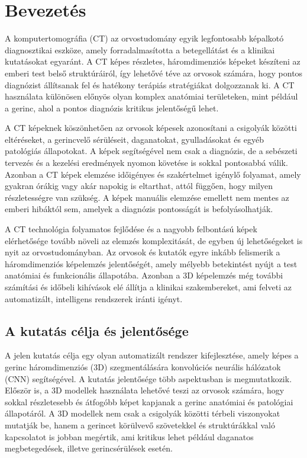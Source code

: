 \chapter{Bevezetés}  %
A komputertomográfia (CT) az orvostudomány egyik legfontosabb képalkotó diagnosztikai eszköze, amely forradalmasította a betegellátást és a klinikai kutatásokat egyaránt. A CT képes részletes, háromdimenziós képeket készíteni az emberi test belső struktúráiról, így lehetővé téve az orvosok számára, hogy pontos diagnózist állítsanak fel és hatékony terápiás stratégiákat dolgozzanak ki. A CT használata különösen előnyös olyan komplex anatómiai területeken, mint például a gerinc, ahol a pontos diagnózis kritikus jelentőségű lehet.

A CT képeknek köszönhetően az orvosok képesek azonosítani a csigolyák közötti eltéréseket, a gerincvelő sérüléseit, daganatokat, gyulladásokat és egyéb patológiás állapotokat. A képek segítségével nem csak a diagnózis, de a sebészeti tervezés és a kezelési eredmények nyomon követése is sokkal pontosabbá válik. Azonban a CT képek elemzése időigényes és szakértelmet igénylő folyamat, amely gyakran órákig vagy akár napokig is eltarthat, attól függően, hogy milyen részletességre van szükség. A képek manuális elemzése emellett nem mentes az emberi hibáktól sem, amelyek a diagnózis pontosságát is befolyásolhatják.

A CT technológia folyamatos fejlődése és a nagyobb felbontású képek elérhetősége tovább növeli az elemzés komplexitását, de egyben új lehetőségeket is nyit az orvostudományban. Az orvosok és kutatók egyre inkább felismerik a háromdimenziós képelemzés jelentőségét, amely mélyebb betekintést nyújt a test anatómiai és funkcionális állapotába. Azonban a 3D képelemzés még további számítási és időbeli kihívások elé állítja a klinikai szakembereket, ami felveti az automatizált, intelligens rendszerek iránti igényt.
\section{A kutatás célja és jelentősége}  %
A jelen kutatás célja egy olyan automatizált rendszer kifejlesztése, amely képes a gerinc háromdimenziós (3D) szegmentálására konvolúciós neurális hálózatok (CNN) segítségével. A kutatás jelentősége több aspektusban is megmutatkozik. Először is, a 3D modellek használata lehetővé teszi az orvosok számára, hogy sokkal részletesebb és átfogóbb képet kapjanak a gerinc anatómiai és patológiai állapotáról. A 3D modellek nem csak a csigolyák közötti térbeli viszonyokat mutatják be, hanem a gerincet körülvevő szövetekkel és struktúrákkal való kapcsolatot is jobban megértik, ami kritikus lehet például daganatos megbetegedések, illetve gerincsérülések esetén.

